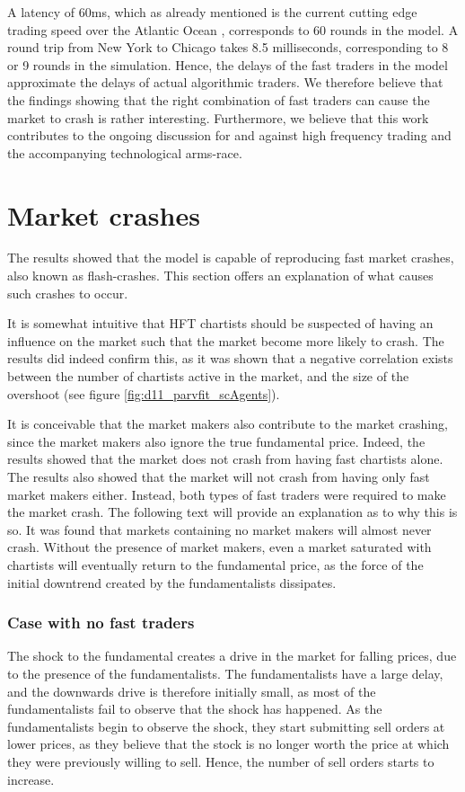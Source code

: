 A latency of 60ms, which as already mentioned is the current cutting edge trading speed over the Atlantic Ocean \cite{williams2011cable, phillips2012cable}, corresponds to 60 rounds in the model. A round trip from New York to Chicago takes 8.5 milliseconds\cite{adler2012cable}, corresponding to 8 or 9 rounds in the simulation. Hence, the delays of the fast traders in the model approximate the delays of actual algorithmic traders. We therefore believe that the findings showing that the right combination of fast traders can cause the market to crash is rather interesting. Furthermore, we believe that this work contributes to the ongoing discussion for and against high frequency trading and the accompanying technological arms-race. 


\section{Market crashes}
The results showed that the model is capable of reproducing fast market crashes, also known as flash-crashes. This section offers an explanation of what causes such crashes to occur.

It is somewhat intuitive that HFT chartists should be suspected of having an influence on the market such that the market become more likely to crash. The results did indeed confirm this, as it was shown that a negative correlation exists between the number of chartists active in the market, and the size of the overshoot (see figure \ref{fig:d11_parvfit_scAgents}). 

It is conceivable that the market makers also contribute to the market crashing, since the market makers also ignore the true fundamental price. Indeed, the results showed that the market does not crash from having fast chartists alone. The results also showed that the market will not crash from having only fast market makers either. Instead, both types of fast traders were required to make the market crash. The following text will provide an explanation as to why this is so. It was found that markets containing no market makers will almost never crash. Without the presence of market makers, even a market saturated with chartists will eventually return to the fundamental price, as the force of the initial downtrend created by the fundamentalists dissipates. 


\subsubsection*{Case with no fast traders}
The shock to the fundamental creates a drive in the market for falling prices, due to the presence of the fundamentalists. The fundamentalists have a large delay, and the downwards drive is therefore initially small, as most of the fundamentalists fail to observe that the shock has happened. As the fundamentalists begin to observe the shock, they start submitting sell orders at lower prices, as they believe that the stock is no longer worth the price at which they were previously willing to sell. Hence, the number of sell orders starts to increase. 

